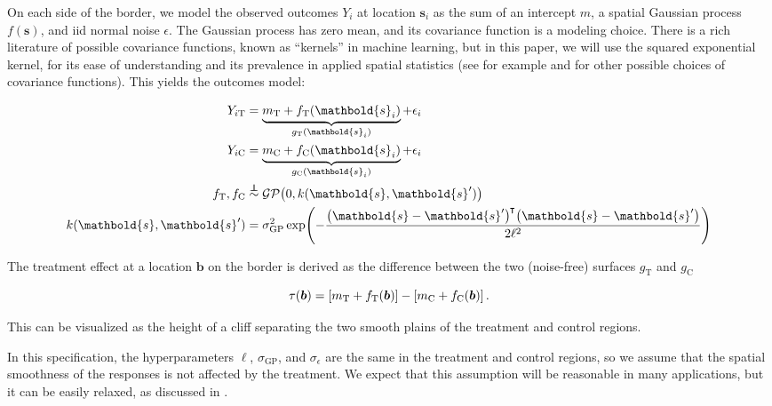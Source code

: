 \documentclass[letter]{article}
\DeclarePairedDelimiter{\parenthesis}{\lparen}{\rparen}
\DeclarePairedDelimiter{\squarebracket}{\lbrack}{\rbrack}
\newcommand{\del}[1]{\parenthesis*{#1}}
\newcommand{\sbr}[1]{\squarebracket*{#1}}
\newcommand{\gp}{\mathcal{GP}}
\newcommand*{\trans}{^{\mkern-1.5mu\intercal}}
\newcommand{\treat}{\mathrm{T}}
\newcommand{\ctrol}{\mathrm{C}}
\newcommand{\sigmaf}{\sigma_{\mathrm{GP}}}
\newcommand{\sigman}{\sigma_{\epsilon}}
\newcommand{\svec}{\mathbold{s}}
\newcommand{\indep}{\protect\mathpalette{\protect\independenT}{\perp}}
\def\independenT#1#2{\mathrel{\rlap{$#1#2$}\mkern2mu{#1#2}}}
\newcommand{\sentinel}{\bm{b}}
\newcommand{\eqlabel}[1]{\label{#1}}
\renewcommand{\cite}[1]{\citet{#1}}
\begin{document}
On each side of the border, we model the observed outcomes \(Y_i\) at location \(\svec_i\) as the sum of an intercept \(m\), a spatial Gaussian process \(f(\svec)\), and iid normal noise \(\epsilon\).
The Gaussian process has zero mean, and its covariance function is a modeling choice.
There is a rich literature of possible covariance functions, known as ``kernels'' in machine learning, but in this paper, we will use the squared exponential kernel, for its ease of understanding and its prevalence in applied spatial statistics
(see for example \cite{banerjee2014hierarchical} and \cite{rasmussen2006gaussian} for other possible choices of covariance functions).
This yields the outcomes model:

\begin{equation}
\begin{split}
Y_{i\treat} &= \underbrace{m_\treat{} + f_\treat{}(\svec_i)}_{g_\treat{}(\svec_i)} + \epsilon_i \\
Y_{i\ctrol} &= \underbrace{m_\ctrol{} + f_\ctrol{}(\svec_i)}_{g_\ctrol{}(\svec_i)} + \epsilon_i \\
f_\treat{}, f_\ctrol{} &\overset{\indep}{\sim} \gp\del{0, k(\svec, \svec')} \\
k(\svec,\svec') &= \sigmaf^2 \exp\del{ - \frac{\del{\svec-\svec'}\trans\del{\svec-\svec'}}{2 \ell^2}}
\end{split}
\eqlabel{eq:spec2gp}
\end{equation}
    


    	The treatment effect at a location \(\sentinel\) on the border is derived as the difference between the two (noise-free) surfaces \(g_\treat{}\) and \(g_\ctrol{}\)

\begin{equation}
\tau(\sentinel) = \sbr{m_\treat{} + f_\treat{}(\sentinel)} - \sbr{m_\ctrol{} + f_\ctrol{}(\sentinel)}\,.
\end{equation}

This can be visualized as the height of a cliff separating the two smooth plains of the treatment and control regions.

In this specification, the hyperparameters \(\ell\), \(\sigmaf\), and \(\sigman\) are the same in the treatment and control regions, so we assume that the spatial smoothness of the responses is not affected by the treatment.
We expect that this assumption will be reasonable in many applications, but it can be easily relaxed, as discussed in \cite{Branson:2017qy}.
    
\end{document}
